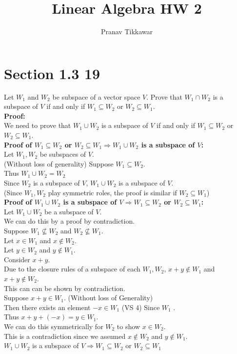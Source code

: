 \documentclass{article}
\author{Pranav Tikkawar}
\title{Linear Algebra HW 2}
\begin{document}
\maketitle
\section*{Section 1.3 19}
Let $W_1$ and $W_2$ be subspace of a vector space $V$. Prove that $W_1 \cap W_2$  is a subspace of $V$ if and only if $W_1 \subseteq W_2$ or $W_2 \subseteq W_1$.\\
\textbf{Proof:}\\
We need to prove that $W_1 \cup W_2$ is a subspace of $V$ if and only if $W_1 \subseteq W_2$ or $W_2 \subseteq W_1$.\\
\textbf{Proof of $W_1 \subseteq W_2$ or $W_2 \subseteq W_1 \Rightarrow W_1 \cup W_2$ is a subspace of $V$:}\\
Let $W_1, W_2$ be subspaces of $V$.\\
(Without loss of generality) Suppose $W_1 \subseteq W_2$. \\
Thus $W_1 \cup W_2 = W_2$\\
Since $W_2$ is a subspace of $V$, $W_1 \cup W_2$ is a subspace of $V$.\\
(Since $W_1, W_2$  play symmetric roles, the proof is similar if $W_2 \subseteq W_1$)\\
\textbf{Proof of $W_1 \cup W_2$ is a subspace of $V \Rightarrow W_1 \subseteq W_2$ or $W_2 \subseteq W_1$:}\\
Let $W_1 \cup W_2$ be a subspace of $V$.\\
We can do this by a proof by contradiction.\\
Suppose $W_1 \not\subseteq W_2$ and $W_2 \not\subseteq W_1$.\\
Let $x \in W_1$ and $x \not\in W_2$.\\
Let $y \in W_2$ and $y \not\in W_1$.\\
Consider $x + y$.\\
Due to the closure rules of a subspace of each $W_1, W_2$, $x + y \notin W_1$ and $x + y \notin W_2$.\\
This can can be shown by contradiction.\\
Suppose $x + y \in W_1$. (Without loss of Generality)\\
Then there exists an element $-x \in W_1$ (VS 4) Since $W_1$ .\\ 
Thus $x + y + (-x) = y \in W_1$.\\
We can do this symmetrically for $W_2$ to show $x \in W_2$.\\
This is a contradiction since we assumed $x \not\in W_2$ and $y \not\in W_1$.\\
$W_1 \cup W_2$ is a subspace of $V \Rightarrow W_1 \subseteq W_2$ or $W_2 \subseteq W_1$
\end{document}
